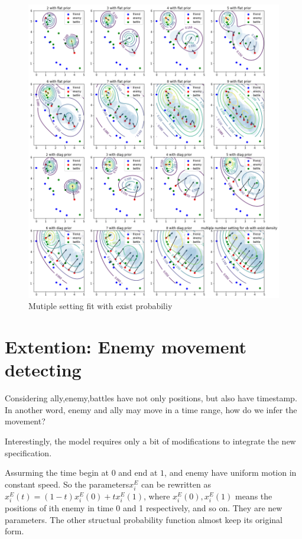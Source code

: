 \documentclass{article}
\begin{document}
\begin{figure}[h]
\includegraphics[width=0.99\linewidth]{big_vb_exist_prob.png}
\caption{Mutiple setting fit with exist probabiliy}
\label{fig:bigVbExist}
\end{figure}



\section{Extention: Enemy movement detecting}

Considering ally,enemy,battles have not only positions, but also have timestamp. In another word,
enemy and ally may move in a time range, how do we infer the movement?

Interestingly, the model requires only a bit of modifications to integrate the new specification.

Assurming the time begin at $0$ and end at $1$, and enemy have uniform motion in constant speed.
So the parameters$x^E_i$ can be rewritten as $x^E_i(t) = (1-t)x^E_i(0) + tx^E_i(1)$, 
where $x^E_i(0),x^E_i(1)$ means the positions of ith enemy in time 0 and 1 respectively, and so on.
They are new parameters. The other structual probability function almost keep its original form.
\end{document}
